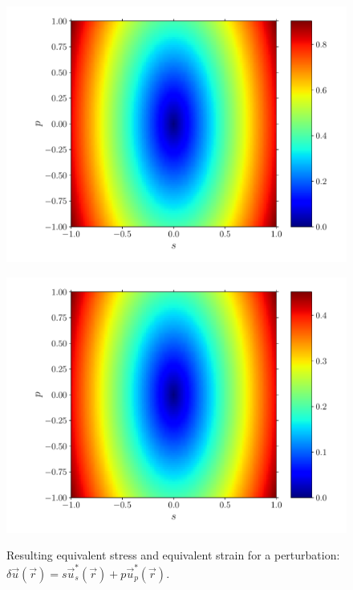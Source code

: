\documentclass[fleqn]{goose-article}
\begin{document}
\begin{figure}[htp]
    \centering
    \captionsetup[subfigure]{justification=centering}
    \begin{minipage}[t]{.49\textwidth}
        \centering
        \includegraphics[width=\textwidth]{perturbation_phase-diagram_sig.pdf}
        \label{fig:phase-diagram:sig}
    \end{minipage}
    \hfill
    \begin{minipage}[t]{.49\textwidth}
        \centering
        \includegraphics[width=\textwidth]{perturbation_phase-diagram_eps.pdf}
        \label{fig:phase-diagram:eps}
    \end{minipage}
    \caption{
        Resulting
         equivalent stress and
         equivalent strain
        for a perturbation:
        $\delta \vec{u}(\vec{r}) = s \vec{u}^*_s (\vec{r}) + p \vec{u}^*_p (\vec{r})$.
    }
    \label{fig:phase-diagram}
\end{figure}
\end{document}
